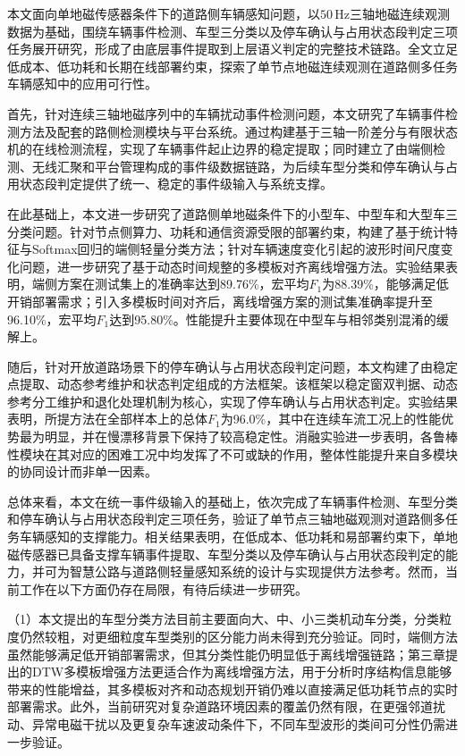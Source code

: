 \documentclass{xdupgthesis}
\begin{document}
本文面向单地磁传感器条件下的道路侧车辆感知问题，以$50\,\mathrm{Hz}$三轴地磁连续观测数据为基础，围绕车辆事件检测、车型三分类以及停车确认与占用状态段判定三项任务展开研究，形成了由底层事件提取到上层语义判定的完整技术链路。全文立足低成本、低功耗和长期在线部署约束，探索了单节点地磁连续观测在道路侧多任务车辆感知中的应用可行性。

首先，针对连续三轴地磁序列中的车辆扰动事件检测问题，本文研究了车辆事件检测方法及配套的路侧检测模块与平台系统。通过构建基于三轴一阶差分与有限状态机的在线检测流程，实现了车辆事件起止边界的稳定提取；同时建立了由端侧检测、无线汇聚和平台管理构成的事件级数据链路，为后续车型分类和停车确认与占用状态段判定提供了统一、稳定的事件级输入与系统支撑。

在此基础上，本文进一步研究了道路侧单地磁条件下的小型车、中型车和大型车三分类问题。针对节点侧算力、功耗和通信资源受限的部署约束，构建了基于统计特征与Softmax回归的端侧轻量分类方法；针对车辆速度变化引起的波形时间尺度变化问题，进一步研究了基于动态时间规整的多模板对齐离线增强方法。实验结果表明，端侧方案在测试集上的准确率达到89.76\%，宏平均$F_1$为88.39\%，能够满足低开销部署需求；引入多模板时间对齐后，离线增强方案的测试集准确率提升至96.10\%，宏平均$F_1$达到95.80\%。性能提升主要体现在中型车与相邻类别混淆的缓解上。

随后，针对开放道路场景下的停车确认与占用状态段判定问题，本文构建了由稳定点提取、动态参考维护和状态判定组成的方法框架。该框架以稳定窗双判据、动态参考分工维护和退化处理机制为核心，实现了停车确认与占用状态判定。实验结果表明，所提方法在全部样本上的总体$F_1$为96.0\%，其中在连续车流工况上的性能优势最为明显，并在慢漂移背景下保持了较高稳定性。消融实验进一步表明，各鲁棒性模块在其对应的困难工况中均发挥了不可或缺的作用，整体性能提升来自多模块的协同设计而非单一因素。

总体来看，本文在统一事件级输入的基础上，依次完成了车辆事件检测、车型分类和停车确认与占用状态段判定三项任务，验证了单节点三轴地磁观测对道路侧多任务车辆感知的支撑能力。相关结果表明，在低成本、低功耗和易部署约束下，单地磁传感器已具备支撑车辆事件提取、车型分类以及停车确认与占用状态段判定的能力，并可为智慧公路与道路侧轻量感知系统的设计与实现提供方法参考。然而，当前工作在以下方面仍存在局限，有待后续进一步研究。

（1）本文提出的车型分类方法目前主要面向大、中、小三类机动车分类，分类粒度仍然较粗，对更细粒度车型类别的区分能力尚未得到充分验证。同时，端侧方法虽然能够满足低开销部署需求，但其分类性能仍明显低于离线增强链路；第三章提出的DTW多模板增强方法更适合作为离线增强方法，用于分析时序结构信息能够带来的性能增益，其多模板对齐和动态规划开销仍难以直接满足低功耗节点的实时部署需求。此外，当前研究对复杂道路环境因素的覆盖仍然有限，在更强邻道扰动、异常电磁干扰以及更复杂车速波动条件下，不同车型波形的类间可分性仍需进一步验证。
\end{document}
